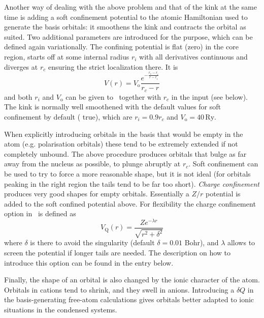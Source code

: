 Another way of dealing with the above problem and that of the kink at the
same time is adding a soft confinement potential to the atomic
Hamiltonian used to generate the basis orbitals: it smoothens the kink
and contracts the orbital as suited. Two additional parameters are
introduced for the purpose, which can be defined again variationally.
The confining potential is flat (zero) in the core region, starts off
at some internal radius $r_i$ with all derivatives continuous and
diverges at $r_c$ ensuring the strict localization there.  It is
\begin{equation}
  V(r) = V_{\mathrm o} \frac{e^{- { \frac{r_c - r_i}{r - r_i} } }}{r_c -r}
\end{equation}
and both $r_i$ and $V_{\mathrm o}$ can be given to \siesta\ together
with $r_c$ in the input (see  below).
The kink is normally well smoothened with the default values 
for soft confinement by default ( true), which 
are $r_i = 0.9 r_c$ and $V_{\mathrm o} = 40\,\mathrm{Ry}$.

When explicitly introducing orbitals in the basis that would be empty in 
the atom (e.g. polarisation orbitals) these tend to be extremely 
extended if not completely unbound. The above procedure produces
orbitals that bulge as far away from the nucleus as possible, to 
plunge abruptly at $r_c$. Soft confinement can be used to try
to force a more reasonable shape, but it is not ideal (for orbitals
peaking in the right region the tails tend to be far too short).
\textit{Charge confinement}  produces
very good shapes for empty orbitals. Essentially a $Z/r$ potential
is added to the soft confined potential above. For flexibility
the charge confinement option in \siesta\ is defined as
\begin{equation}
  V_{\mathrm Q}(r) = \frac{Z e^{-\lambda r}}{\sqrt{r^2 + \delta^2}}
\end{equation}
where $\delta$ is there to avoid the singularity (default $\delta=0.01$ Bohr),
and $\lambda$ allows to screen the potential if longer tails are needed.
The description on how to introduce this option can be found in
the  entry below.

Finally, the shape of an orbital is also changed by the ionic
character of the atom.  Orbitals in cations tend to shrink, and they
swell in anions.  Introducing a $\delta Q$ in the basis-generating
free-atom calculations gives orbitals better adapted to ionic
situations in the condensed systems.

